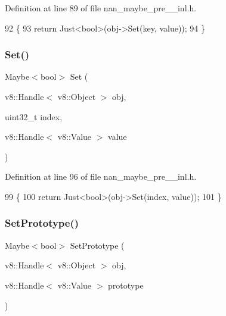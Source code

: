 Definition at line 89 of file nan\+\_\+maybe\+\_\+pre\+\_\+\_\+inl.\+h.


\begin{DoxyCode}
92                              \{
93   \textcolor{keywordflow}{return} Just<bool>(obj->Set(key, value));
94 \}
\end{DoxyCode}
\mbox{\label{nan__maybe__pre__43__inl_8h_ab5ac0f372a05fcb2dcd75c1501b7229a}} 
\subsubsection{Set()\hspace{0.1cm}{\footnotesize\ttfamily [2/2]}}
{\footnotesize\ttfamily Maybe$<$bool$>$ Set (\begin{DoxyParamCaption}\item[{v8\+::\+Handle$<$ v8\+::\+Object $>$}]{obj,  }\item[{uint32\+\_\+t}]{index,  }\item[{v8\+::\+Handle$<$ v8\+::\+Value $>$}]{value }\end{DoxyParamCaption})}



Definition at line 96 of file nan\+\_\+maybe\+\_\+pre\+\_\+\_\+inl.\+h.


\begin{DoxyCode}
99                              \{
100   \textcolor{keywordflow}{return} Just<bool>(obj->Set(index, value));
101 \}
\end{DoxyCode}
\mbox{\label{nan__maybe__pre__43__inl_8h_a869ccb3507889b12d4d59462f0a2ecc1}} 
\subsubsection{Set\+Prototype()}
{\footnotesize\ttfamily Maybe$<$bool$>$ Set\+Prototype (\begin{DoxyParamCaption}\item[{v8\+::\+Handle$<$ v8\+::\+Object $>$}]{obj,  }\item[{v8\+::\+Handle$<$ v8\+::\+Value $>$}]{prototype }\end{DoxyParamCaption})}



